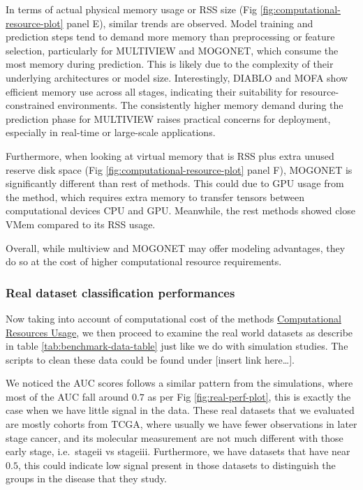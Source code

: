 \documentclass[
]{article}
\begin{document}
In terms of actual physical memory usage or RSS size (Fig \ref{fig:computational-resource-plot} panel E), similar trends are observed. Model training and prediction steps tend to demand more memory than preprocessing or feature selection, particularly for MULTIVIEW and MOGONET, which consume the most memory during prediction. This is likely due to the complexity of their underlying architectures or model size. Interestingly, DIABLO and MOFA show efficient memory use across all stages, indicating their suitability for resource-constrained environments. The consistently higher memory demand during the prediction phase for MULTIVIEW raises practical concerns for deployment, especially in real-time or large-scale applications.

Furthermore, when looking at virtual memory that is RSS plus extra unused reserve disk space (Fig \ref{fig:computational-resource-plot} panel F), MOGONET is significantly different than rest of methods. This could due to GPU usage from the method, which requires extra memory to transfer tensors between computational devices CPU and GPU. Meanwhile, the rest methods showed close VMem compared to its RSS usage.

Overall, while multiview and MOGONET may offer modeling advantages, they do so at the cost of higher computational resource requirements.

\hypertarget{real-dataset-classification-performances}{%
\subsubsection{Real dataset classification performances}\label{real-dataset-classification-performances}}

Now taking into account of computational cost of the methods \protect\hyperlink{computational-resources-usage}{Computational Resources Usage}, we then proceed to examine the real world datasets as describe in table \ref{tab:benchmark-data-table} just like we do with simulation studies. The scripts to clean these data could be found under {[}insert link here\ldots{]}.

We noticed the AUC scores follows a similar pattern from the simulations, where most of the AUC fall around \(0.7\) as per Fig \ref{fig:real-perf-plot}, this is exactly the case when we have little signal in the data.
These real datasets that we evaluated are mostly cohorts from TCGA, where usually we have fewer observations in later stage cancer, and its molecular measurement are not much different with those early stage, i.e.~stageii vs stageiii. Furthermore, we have datasets that have near \(0.5\), this could indicate low signal present in those datasets to distinguish the groups in the disease that they study.
\end{document}
